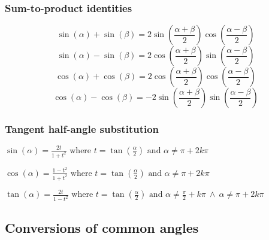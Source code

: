 \subsubsection{Sum-to-product identities}
\[
\sin(\alpha)+\sin(\beta) = 2\sin\left(\frac{\alpha+\beta}{2}\right)\cos\left(\frac{\alpha-\beta}{2}\right)
\]
\[
\sin(\alpha)-\sin(\beta) = 2\cos\left(\frac{\alpha+\beta}{2}\right)\sin\left(\frac{\alpha-\beta}{2}\right)
\]
\[
\cos(\alpha)+\cos(\beta) = 2\cos\left(\frac{\alpha+\beta}{2}\right)\cos\left(\frac{\alpha-\beta}{2}\right)
\]
\[
\cos(\alpha)-\cos(\beta) = -2\sin\left(\frac{\alpha+\beta}{2}\right)\sin\left(\frac{\alpha-\beta}{2}\right)
\]

\subsubsection{Tangent half-angle substitution}
$ \displaystyle \sin(\alpha) = \frac{2t}{1+t^2} \text{ where } t=\tan\left(\frac{\alpha}{2}\right) \text{ and } \alpha \ne \pi + 2k\pi $

$ \displaystyle \cos(\alpha) = \frac{1-t^2}{1+t^2} \text{ where } t=\tan\left(\frac{\alpha}{2}\right) \text{ and } \alpha \ne \pi + 2k\pi $

$ \displaystyle \tan(\alpha) = \frac{2t}{1-t^2} \text{ where } t=\tan\left(\frac{\alpha}{2}\right) \text{ and } \alpha \ne \frac{\pi}{2} + k\pi \ \wedge \ \alpha \ne \pi + 2k\pi $


\subsection{Conversions of common angles}


